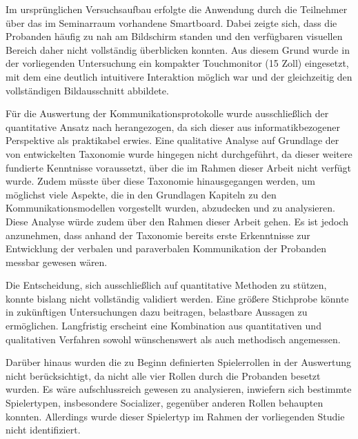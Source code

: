 Im ursprünglichen Versuchsaufbau erfolgte die Anwendung durch die Teilnehmer über das im Seminarraum vorhandene Smartboard. Dabei zeigte sich, dass die Probanden häufig zu nah am Bildschirm standen und den verfügbaren visuellen Bereich daher nicht vollständig überblicken konnten. Aus diesem Grund wurde in der vorliegenden Untersuchung ein kompakter Touchmonitor (15 Zoll) eingesetzt, mit dem eine deutlich intuitivere Interaktion möglich war und der gleichzeitig den vollständigen Bildausschnitt abbildete.

Für die Auswertung der Kommunikationsprotokolle wurde ausschließlich der quantitative Ansatz nach \cite{nasir_effect_2015} herangezogen, da sich dieser aus informatikbezogener Perspektive als praktikabel erwies. Eine qualitative Analyse auf Grundlage der von \cite{baykal_collaboration_2023} entwickelten Taxonomie wurde hingegen nicht durchgeführt, da dieser weitere fundierte Kenntnisse voraussetzt, über die im Rahmen dieser Arbeit nicht verfügt wurde. Zudem müsste über diese Taxonomie hinausgegangen werden, um möglichst viele Aspekte, die in den Grundlagen Kapiteln zu den Kommunikationsmodellen vorgestellt wurden, abzudecken und zu analysieren. Diese Analyse würde zudem über den Rahmen dieser Arbeit gehen. Es ist jedoch anzunehmen, dass anhand der Taxonomie bereits erste Erkenntnisse zur Entwicklung der verbalen und paraverbalen Kommunikation der Probanden messbar gewesen wären.

Die Entscheidung, sich ausschließlich auf quantitative Methoden zu stützen, konnte bislang nicht vollständig validiert werden. Eine größere Stichprobe könnte in zukünftigen Untersuchungen dazu beitragen, belastbare Aussagen zu ermöglichen. Langfristig erscheint eine Kombination aus quantitativen und qualitativen Verfahren sowohl wünschenswert als auch methodisch angemessen.

Darüber hinaus wurden die zu Beginn definierten Spielerrollen in der Auswertung nicht berücksichtigt, da nicht alle vier Rollen durch die Probanden besetzt wurden. Es wäre aufschlussreich gewesen zu analysieren, inwiefern sich bestimmte Spielertypen, insbesondere Socializer, gegenüber anderen Rollen behaupten konnten. Allerdings wurde dieser Spielertyp im Rahmen der vorliegenden Studie nicht identifiziert.